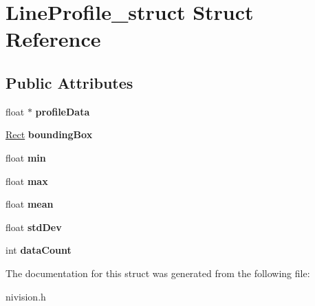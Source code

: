 \hypertarget{structLineProfile__struct}{\section{\-Line\-Profile\-\_\-struct \-Struct \-Reference}
\label{structLineProfile__struct}
}
\subsection*{\-Public \-Attributes}
\begin{DoxyCompactItemize}
\item 
\hypertarget{structLineProfile__struct_a000fbe99a086411f95bccac70642cfd1}{float $\ast$ {\bfseries profile\-Data}}\label{structLineProfile__struct_a000fbe99a086411f95bccac70642cfd1}

\item 
\hypertarget{structLineProfile__struct_a3cff006ee59a4b0d374e246f563c4b11}{\hyperlink{structRect__struct}{\-Rect} {\bfseries bounding\-Box}}\label{structLineProfile__struct_a3cff006ee59a4b0d374e246f563c4b11}

\item 
\hypertarget{structLineProfile__struct_ab3e1b654a4aa528b6a972aa5aa3b7e16}{float {\bfseries min}}\label{structLineProfile__struct_ab3e1b654a4aa528b6a972aa5aa3b7e16}

\item 
\hypertarget{structLineProfile__struct_a0a9e3bef423bac80f4ab8a72fb9f261c}{float {\bfseries max}}\label{structLineProfile__struct_a0a9e3bef423bac80f4ab8a72fb9f261c}

\item 
\hypertarget{structLineProfile__struct_a9cc8f7ae8ca8048de1904f77fa3507ab}{float {\bfseries mean}}\label{structLineProfile__struct_a9cc8f7ae8ca8048de1904f77fa3507ab}

\item 
\hypertarget{structLineProfile__struct_ad2cf684f4753aec341efb718e9846bd2}{float {\bfseries std\-Dev}}\label{structLineProfile__struct_ad2cf684f4753aec341efb718e9846bd2}

\item 
\hypertarget{structLineProfile__struct_a6da5e04511833722b01ffdf7130ec32b}{int {\bfseries data\-Count}}\label{structLineProfile__struct_a6da5e04511833722b01ffdf7130ec32b}

\end{DoxyCompactItemize}


\-The documentation for this struct was generated from the following file\-:\begin{DoxyCompactItemize}
\item 
nivision.\-h\end{DoxyCompactItemize}
